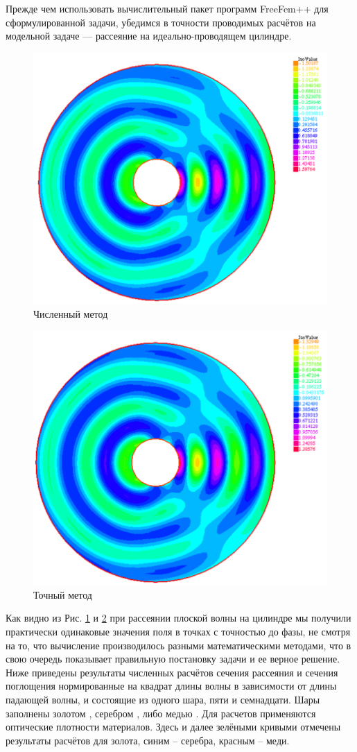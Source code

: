 Прежде чем использовать вычислительный пакет программ FreeFem++ для сформулированной задачи, убедимся в точности проводимых расчётов на модельной задаче --- рассеяние на идеально-проводящем цилиндре.
\begin{figure}[h!]
	\centering
	\includegraphics[width=0.8\linewidth]{sc1.png}
	\caption{Численный метод}
	\label{fig:sc1}
\end{figure} 
\newpage
\begin{figure}[h!]
	\centering
	\includegraphics[width=0.8\linewidth]{sc2.png}
	\caption{Точный метод}
	\label{fig:sc2}
\end{figure}
Как видно из Рис. \ref{fig:sc1} и \ref{fig:sc2} при рассеянии плоской волны на цилиндре мы получили практически одинаковые значения поля в точках с точностью до фазы, не смотря на то, что вычисление производилось разными математическими методами, что в свою очередь показывает правильную постановку задачи и ее верное решение. \\ 
Ниже приведены результаты численных расчётов сечения рассеяния и сечения поглощения нормированные на квадрат длины волны в зависимости от длины падающей волны, и состоящие из одного шара, пяти и семнадцати. Шары заполнены золотом \cite{Olmon2012}, серебром \cite{Yang2015}, либо медью \cite{Querry1985}. Для расчетов применяются оптические плотности материалов. Здесь и далее зелёными кривыми отмечены результаты расчётов для золота, синим – серебра, красным – меди.

